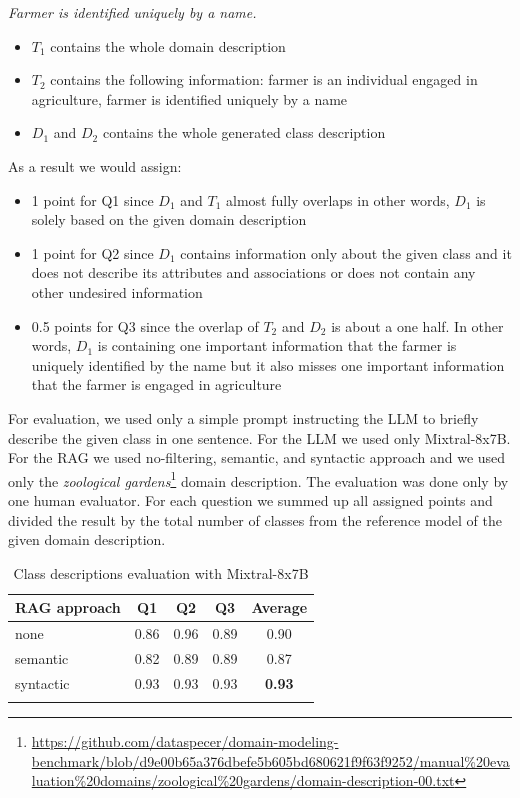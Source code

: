 \noindent{}\textit{Farmer is identified uniquely by a name.}

\begin{itemize}
\item $T_1$ contains the whole domain description
\item $T_2$ contains the following information: farmer is an individual engaged in agriculture, farmer is identified uniquely by a name
\item $D_1$ and $D_2$ contains the whole generated class description
\end{itemize}

\noindent{}As a result we would assign:

\begin{itemize}
\item 1 point for Q1 since $D_1$ and $T_1$ almost fully overlaps in other words, $D_1$ is solely based on the given domain description
\item 1 point for Q2 since $D_1$ contains information only about the given class and it does not describe its attributes and associations or does not contain any other undesired information
\item 0.5 points for Q3 since the overlap of $T_2$ and $D_2$ is about a one half. In other words, $D_1$ is containing one important information that the farmer is uniquely identified by the name but it also misses one important information that the farmer is engaged in agriculture
\end{itemize}

For evaluation, we used only a simple prompt instructing the LLM to briefly describe the given class in one sentence. For the LLM we used only Mixtral-8x7B. For the RAG we used no-filtering, semantic, and syntactic approach and we used only the \emph{zoological gardens}\footnote{\url{https://github.com/dataspecer/domain-modeling-benchmark/blob/d9e00b65a376dbefe5b605bd680621f9f63f9252/manual\%20evaluation\%20domains/zoological\%20gardens/domain-description-00.txt}} domain description. The evaluation was done only by one human evaluator. For each question we summed up all assigned points and divided the result by the total number of classes from the reference model of the given domain description.

\begin{table}[!h]
    \scriptsize
    \centering
    \setlength{\tabcolsep}{0.5em}
    \begin{tabular}{lcccc}
     \toprule
        RAG approach & Q1 & Q2 & Q3 & Average \\
    \toprule
    
    \addlinespace
         none       & 0.86 & 0.96 & 0.89 & 0.90 \\
    	 semantic   & 0.82 & 0.89 & 0.89 & 0.87 \\
         syntactic  & 0.93 & 0.93 & 0.93 & \textbf{0.93} \\
    \addlinespace
    \bottomrule
    \addlinespace
    \end{tabular}
    \caption{Class descriptions evaluation with Mixtral-8x7B}
    \label{tab:mixtral-classes-descriptions}
\end{table}


